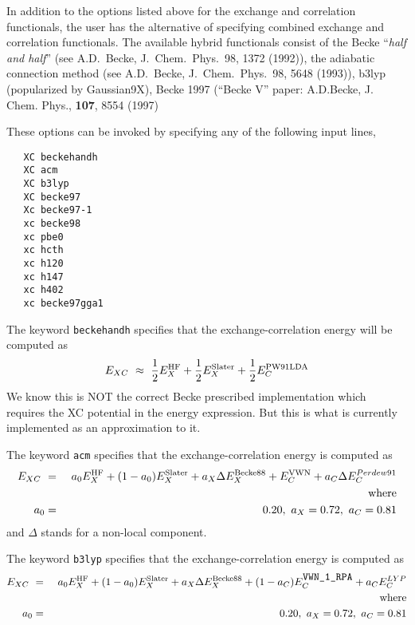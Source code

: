 In addition to the options listed above for the exchange and correlation
functionals, the user has the alternative of specifying combined exchange and 
correlation functionals.
  The available hybrid functionals consist of the Becke
``{\sl half and half}'' (see A.D.~Becke, J.~Chem.~Phys.~98, 1372 (1992)), the
adiabatic connection method (see A.D.~Becke, J.~Chem.~Phys.~98, 5648
(1993)),  b3lyp (popularized by Gaussian9X), Becke 1997 (``Becke V'' paper: A.D.Becke, J. Chem. Phys., {\bf 107}, 8554 (1997)

These options can be invoked by specifying any of the following input lines,
\begin{verbatim}
   XC beckehandh
   XC acm
   XC b3lyp
   XC becke97
   Xc becke97-1
   xc becke98
   xc pbe0
   xc hcth
   xc h120
   xc h147
   xc h402
   xc becke97gga1
\end{verbatim}

The keyword \verb+beckehandh+ specifies that the exchange-correlation energy will be
computed as 
\begin{eqnarray*}
E_{XC} \ \approx \ \frac{1}{2} E^{\rm HF}_X + \frac{1}{2} E^{\rm
  Slater}_{X} + \frac{1}{2} E^{\rm PW91LDA}_{C}
\end{eqnarray*}
We know this is NOT the correct Becke prescribed implementation which
requires the XC potential in the energy expression.  But this is what
is currently implemented as an approximation to it.

\clearpage


The keyword \verb+acm+ specifies that the exchange-correlation energy
is computed as
\begin{eqnarray*}
E_{XC} \ &=& \ a_0 E^{\rm HF}_X + (1-a_0) E^{\rm Slater}_{X} +
a_X \Delta E^{\rm Becke88}_{X} + E^{\rm VWN}_C + a_C \Delta E^{Perdew91}_C \\
& &{\rm where } \\
a_0 &=& 0.20, \ a_X = 0.72, \ a_C = 0.81
\end{eqnarray*}
and $\Delta$ stands for a non-local component.


The keyword \verb+b3lyp+ specifies that the exchange-correlation energy
is computed as
\begin{eqnarray*}
E_{XC} \ &=& \ a_0 E^{\rm HF}_X + (1-a_0) E^{\rm Slater}_{X} +
a_X \Delta E^{\rm Becke88}_{X} + (1-a_C)E^{\rm \verb+VWN_1_RPA+}_C + a_C E^{LYP}_C \\
& &{\rm where } \\
a_0 &=& 0.20, \ a_X = 0.72, \ a_C = 0.81
\end{eqnarray*}


